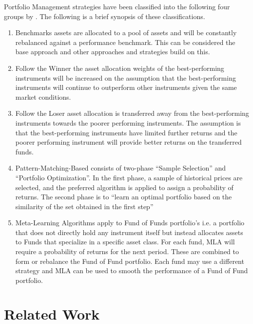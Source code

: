 \documentclass[oneside,12pt]{Classes/RoboticsLaTeX}
\begin{document}
Portfolio Management strategies have been classified into the following four groups by \citet{LiBin2014OpsA} .  The following is a brief synopsis of these classifications.
\begin{enumerate}
\item Benchmarks \citep[7-9]{LiBin2014OpsA} assets are allocated to a pool of assets and will be constantly rebalanced against a performance benchmark. This can be considered the base approach and other approaches and strategies build on this.
\item Follow the Winner \citep[9-15]{LiBin2014OpsA}the asset allocation weights of the best-performing instruments will be increased on the assumption that the best-performing instruments will continue to outperform other instruments given the same market conditions.
\item Follow the Loser \citep[15-19]{LiBin2014OpsA} asset allocation is transferred away from the best-performing instruments towards the poorer performing instruments. The assumption is that the best-performing instruments have limited further returns and the poorer performing instrument will provide better returns on the transferred funds.
\item Pattern-Matching-Based \citep[19-22]{LiBin2014OpsA} consists of two-phase “Sample Selection” and “Portfolio Optimization”. In the first phase, a sample of historical prices are selected, and the preferred algorithm is applied to assign a probability of returns.  The second phase is to “learn an optimal portfolio based on the similarity of the set obtained in the first step”
\item Meta-Learning Algorithms \citep[22-24]{LiBin2014OpsA} apply to Fund of Funds portfolio’s i.e. a  portfolio that does not directly hold any instrument itself but instead allocates assets to Funds that specialize in a specific asset class. For each fund, MLA will require a probability of returns for the next period.  These are combined to form or rebalance the Fund of Fund portfolio. Each fund may use a different strategy and MLA can be used to smooth the performance of a Fund of Fund portfolio.
\end{enumerate}

\chapter{Related Work}
\label{chap:rel_work}
\end{document}
